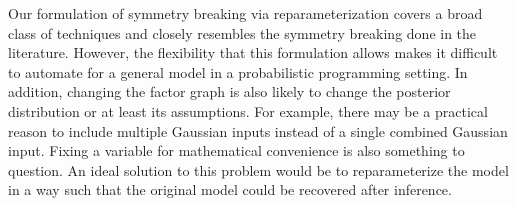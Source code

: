 Our formulation of symmetry breaking via reparameterization covers a broad class of techniques and closely resembles the symmetry breaking done in the literature. However, the flexibility that this formulation allows makes it difficult to automate for a general model in a probabilistic programming setting. In addition, changing the factor graph is also likely to change the posterior distribution or at least its assumptions. For example, there may be a practical reason to include multiple Gaussian inputs instead of a single combined Gaussian input. Fixing a variable for mathematical convenience is also something to question. An ideal solution to this problem would be to reparameterize the model in a way such that the original model could be recovered after inference.



